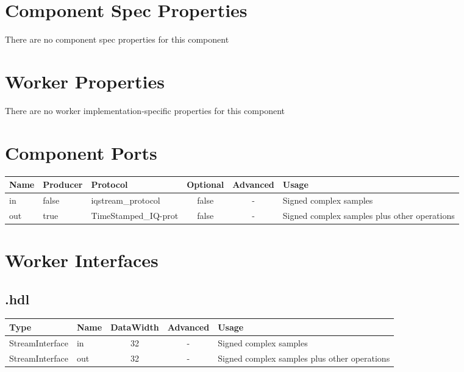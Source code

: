 \begin{landscape}
	\section*{Component Spec Properties}
	There are no component spec properties for this component

	\section*{Worker Properties}
	There are no worker implementation-specific properties for this component

	\section*{Component Ports}
	\begin{scriptsize}
		\begin{tabular}{|M{2cm}|M{1.5cm}|M{4cm}|c|c|M{9cm}|}
			\hline
			Name & Producer & Protocol                       & Optional & Advanced & Usage                                  		\\
			\hline
			in   & false    & iqstream\_protocol			 & false    & -        & Signed complex samples 						\\
			\hline
			out  & true     & TimeStamped\_IQ-prot           & false    & -        & Signed complex samples plus other operations   \\
			\hline
		\end{tabular}
	\end{scriptsize}
	\section*{Worker Interfaces}
	\subsection*{\comp.hdl}
	\begin{scriptsize}
		\begin{tabular}{|M{2cm}|M{1.5cm}|c|c|M{12cm}|}
			\hline
			\rowcolor{blue}
			Type            & Name & DataWidth & Advanced   & Usage                                    		\\
			\hline
			StreamInterface & in   & 32        & - 			& Signed complex samples 						\\
			\hline
			StreamInterface & out  & 32        & - 			& Signed complex samples plus other operations	\\
			\hline
		\end{tabular}
	\end{scriptsize}
\end{landscape}

